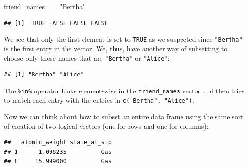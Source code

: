 \documentclass[]{tufte-book}
\newenvironment{Shaded}{\begin{snugshade}}{\end{snugshade}}
\newcommand{\KeywordTok}[1]{\textcolor[rgb]{0.13,0.29,0.53}{\textbf{{#1}}}}
\newcommand{\StringTok}[1]{\textcolor[rgb]{0.31,0.60,0.02}{{#1}}}
\newcommand{\NormalTok}[1]{{#1}}
\begin{document}
\begin{Shaded}
\begin{Highlighting}[]
\NormalTok{friend_names ==}\StringTok{ "Bertha"}
\end{Highlighting}
\end{Shaded}

\begin{verbatim}
## [1]  TRUE FALSE FALSE FALSE
\end{verbatim}

We see that only the first element is set to \texttt{TRUE} as we
suspected since \texttt{"Bertha"} is the first entry in the vector. We,
thus, have another way of subsetting to choose only those names that are
\texttt{"Bertha"} or \texttt{"Alice"}:

\begin{Shaded}
\end{Shaded}

\begin{verbatim}
## [1] "Bertha" "Alice"
\end{verbatim}

The \texttt{\%in\%} operator looks element-wise in the
\texttt{friend\_names} vector and then tries to match each entry with
the entries in \texttt{c("Bertha",\ "Alice")}.

Now we can think about how to subset an entire data frame using the same
sort of creation of two logical vectors (one for rows and one for
columns):

\begin{Shaded}
\end{Shaded}

\begin{verbatim}
##   atomic_weight state_at_stp
## 1      1.008235          Gas
## 8     15.999000          Gas
\end{verbatim}
\end{document}
